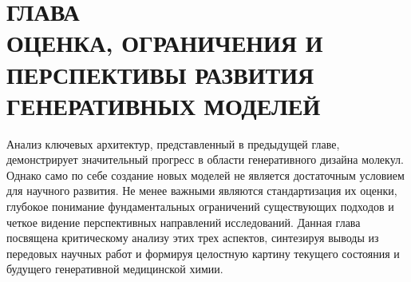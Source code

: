 \documentclass[../main.tex]{subfiles}
\begin{document}
\onlyinsubfile{
    \renewcommand{\contentsname}{ОГЛАВЛЕНИЕ}
    \setcounter{tocdepth}{3}
    \tableofcontents
}

\chapter*{\MakeUppercase{Глава \\ Оценка, ограничения и перспективы развития генеративных моделей}}\label{chapter:evaluation_and_perspectives}

Анализ ключевых архитектур, представленный в предыдущей главе, демонстрирует значительный прогресс в области генеративного дизайна молекул. Однако само по себе создание новых моделей не является достаточным условием для научного развития. Не менее важными являются стандартизация их оценки, глубокое понимание фундаментальных ограничений существующих подходов и четкое видение перспективных направлений исследований. Данная глава посвящена критическому анализу этих трех аспектов, синтезируя выводы из передовых научных работ и формируя целостную картину текущего состояния и будущего генеративной медицинской химии.




\onlyinsubfile{
    \printbibliography[heading=bibintoc, title={Библиографический список}]
}
\end{document}

